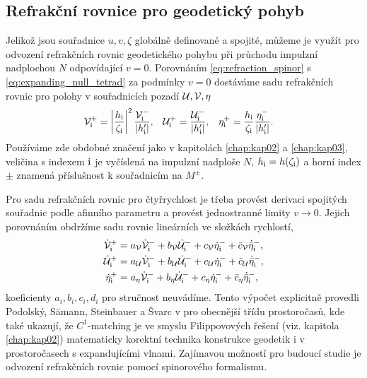 \subsection{Refrakční rovnice pro geodetický pohyb}
Jelikož jsou souřadnice $u, v, \zeta$ globálně definované a spojité, můžeme je využít pro odvození refrakčních rovnic
geodetického pohybu při průchodu impulzní nadplochou $N$ odpovídající $v = 0$.
Porovnáním \eqref{eq:refraction_spinor} s  \eqref{eq:expanding_null_tetrad} za podmínky $v=0$ dostáváme sadu refrakčních rovnic pro
polohy v souřadnicích pozadí $\mathcal{U}, \mathcal{V}, \eta$
\begin{align}
    \mathcal{V}^+_{\mathrm{i}} &= \left| \frac{h_{\mathrm{i}}}{\zeta_{\mathrm{i}}}\right|^2 \frac{\mathcal{V}^-_{\mathrm{i}}}{\left|{h_{\mathrm{i}}'}\right|}, & \mathcal{U}^+_{\mathrm{i}} &= \frac{\mathcal{U}^-_{\mathrm{i}}}{\left|{h_{\mathrm{i}}'}\right|}, & \eta^+_{\mathrm{i}} &= \frac{h_{\mathrm{i}}}{\zeta_{\mathrm{i}}} \frac{\eta^-_{\mathrm{i}}}{\left|{h'_{\mathrm{i}}}\right|}.
\end{align}
Používáme zde obdobné značení jako v kapitolách \ref{chap:kap02} a \ref{chap:kap03},
veličina s indexem $\mathrm{i}$ je vyčíslená na impulzní nadploše $N$, $h_{\mathrm{i}} = h(\zeta_{\mathrm{i}})$ a horní index $\pm$ znamená příslušnost k souřadnicím na $M^\pm$.

Pro sadu refrakčních rovnic pro čtyřrychlost je třeba provést derivaci spojitých souřadnic podle afinního parametru a provést jednostranné limity $v \to 0$.
Jejich porovnáním obdržíme sadu rovnic lineárních ve složkách rychlostí,
\begin{equation}
    \begin{split}
        \dot{\mathcal{V}}_{\mathrm{i}}^+ &= a_{\mathcal{V}} \dot{\mathcal{V}}_{\mathrm{i}}^- + b_{\mathcal{V}} \dot{\mathcal{U}}_{\mathrm{i}}^- + c_{\mathcal{V}} \dot{\eta}_{\mathrm{i}}^- + \bar{c}_{\mathcal{V}} \dot{\bar{\eta}}_{\mathrm{i}}^-, \\
        \dot{\mathcal{U}}_{\mathrm{i}}^+ &= a_{\mathcal{U}} \dot{\mathcal{V}}_{\mathrm{i}}^- + b_{\mathcal{U}} \dot{\mathcal{U}}_{\mathrm{i}}^- + c_{\mathcal{U}} \dot{\eta}_{\mathrm{i}}^- + \bar{c}_{\mathcal{U}} \dot{\bar{\eta}}_{\mathrm{i}}^-, \\
        \dot{\eta}_{\mathrm{i}}^+ &= a_\eta \dot{\mathcal{V}}_{\mathrm{i}}^- + b_\eta \dot{\mathcal{U}}_{\mathrm{i}}^- + c_\eta \dot{\eta}_{\mathrm{i}}^- + \bar{c}_\eta \dot{\bar{\eta}}_{\mathrm{i}}^-,
    \end{split}
\end{equation}
koeficienty $a_i, b_i, c_i, d_i$ pro stručnost neuvádíme. Tento výpočet explicitně provedli Podolský, Sämann, Steinbauer a Švarc v
\cite{Podolsky:2016mqg} pro obecnější třídu prostoročasů, kde také ukazují, že $C^1$-matching je ve smyslu Filippovových řešení (viz. kapitola \ref{chap:kap02})
matematicky korektní technika konstrukce geodetik i v prostoročasech s expandujícími vlnami.
Zajímavou možností pro budoucí studie je odvození refrakčních rovnic pomocí spinorového formalismu.
